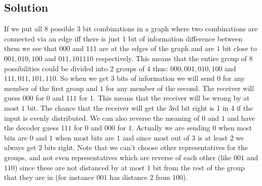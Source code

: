 \documentclass{article}
\begin{document}
\subsection{Solution}
If we put all $8$ possible $3$ bit combinations in a graph where two combinations are connected via an edge iff there is just 1 bit of information difference between them we see that $000$ and $111$ are at the edges of the graph and are $1$ bit close to $001, 010, 100$ and $011, 101 110$ respectively. This means that the entire group of $8$ possibilities could be divided into $2$ groups of $4$ thus: $000, 001, 010, 100$ and $111, 011, 101, 110$. So when we get $3$ bits of information we will send $0$ for any member of the first group and $1$ for any member of the second. The receiver will guess $000$ for $0$ and $111$ for $1$. This means that the receiver will be wrong by at most $1$ bit. The chance that the receiver will get the 3rd bit right is 1 in 4 if the input is evenly distributed. We can also reverse the meaning of $0$ and $1$ and have the decoder guess $111$ for $0$ and $000$ for $1$. Actually we are sending $0$ when most bits are $0$ and $1$ when most bits are $1$ and since most out of $3$ is at least $2$ we always get $2$ bits right. Note that we can't choose other representatives for the groups, and not even representatives which are reverse of each other (like $001$ and $110$) since these are not distanced by at most $1$ bit from the rest of the group that they are in (for instance $001$ has distance $2$ from $100$).

\label{end}
\end{document}
